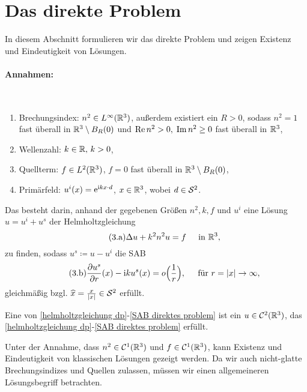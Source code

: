 
\renewcommand\thesection{\Roman{section}}
\setcounter{section}{1}
\section{Das direkte Problem}
\renewcommand\thesection{\arabic{section}}
\renewcommand\thesubsection{\arabic{subsection}}
\setcounter{subsection}{2}
\setcounter{section}{3}

In diesem Abschnitt formulieren wir das direkte Problem und zeigen Existenz und Eindeutigkeit von Lösungen.
\paragraph{Annahmen:}\
\begin{enumerate}[label=(\roman*)]
	\item Brechungsindex: \(n^2\in L^\infty(\mathbb{R}^3)\), außerdem existiert ein \(R>0\), sodass \(n^2=1\) fast überall in \(\mathbb{R}^3\setminus B_R(0)\) und \(\operatorname{Re} n^2>0, \;\operatorname{Im} n^2\geq0\) fast überall in \(\mathbb{R}^3\),
	\item Wellenzahl: \(k\in\mathbb{R},\,k>0\),
	\item Quellterm: \(f\in L^2(\mathbb{R}^3)\), \(f=0\) fast überall in \(\mathbb{R}^3\setminus B_R(0)\),
	\item Primärfeld: \(u^i(x)=\mathrm{e}^{\mathrm{i} kx\cdot d}\), \(x\in\mathbb{R}^3\), wobei \(d\in\mathcal{S}^2\).
\end{enumerate}
Das  besteht darin, anhand der gegebenen Größen \(n^2,k,f\) und \(u^i\) eine Lösung \(u=u^i+u^s\) der Helmholtzgleichung
\begin{equation}
	\label{helmholtzgleichung dp}\tag{3.a}
	\Delta u+k^2n^2u=f\;\;\;\;\text{ in }\mathbb{R}^3,
\end{equation}
zu finden, sodass \(u^s\coloneqq u-u^i\) die \hypertarget{SABdp}{SAB}
\begin{equation}
	\label{SAB direktes problem}\tag{3.b}
	\frac{\partial u^s}{\partial r}(x)-\mathrm{i} ku^s(x)=o\Big(\frac{1}{r}\Big),\;\;\;\;\text{ für }r=|x|\rightarrow\infty,
\end{equation}
gleichmäßig bzgl. \(\widehat{x}=\frac{x}{|x|}\in\mathcal{S}^2\) erfüllt.
\begin{no counter definition}
	Eine  von \eqref{helmholtzgleichung dp}-\eqref{SAB direktes problem} ist ein \(u\in\mathcal{C}^2(\mathbb{R}^3)\), das \eqref{helmholtzgleichung dp}-\eqref{SAB direktes problem} erfüllt.
\end{no counter definition}
Unter der Annahme, dass \(n^2\in\mathcal{C}^1(\mathbb{R}^3)\) und \(f\in\mathcal{C}^1(\mathbb{R}^3)\), kann Existenz und Eindeutigkeit von klassischen Lösungen gezeigt werden. Da wir auch nicht-glatte Brechungsindizes und Quellen zulassen, müssen wir einen allgemeineren Lösungsbegriff betrachten.

